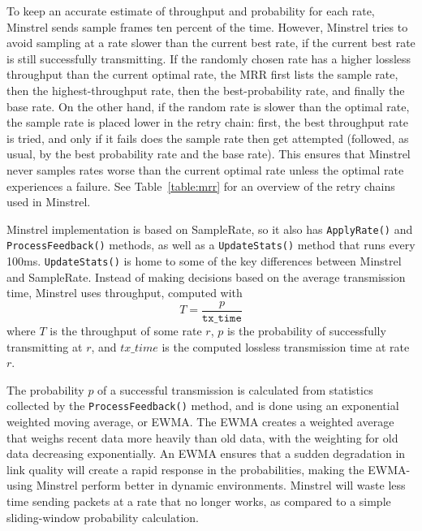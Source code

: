 \documentclass[twocolumn,10pt]{article}
\begin{document}
To keep an accurate estimate of throughput and probability for each
rate, Minstrel sends sample frames ten percent of the time.  However,
Minstrel tries to avoid sampling at a rate slower than the current
best rate, if the current best rate is still successfully
transmitting.  If the randomly chosen rate has a higher lossless
throughput than the current optimal rate, the MRR first lists the
sample rate, then the highest-throughput rate, then the
best-probability rate, and finally the base rate.  On the other hand,
if the random rate is slower than the optimal rate, the sample rate is
placed lower in the retry chain: first, the best throughput rate is
tried, and only if it fails does the sample rate then get attempted
(followed, as usual, by the best probability rate and the base rate).
This ensures that Minstrel never samples rates worse than the current
optimal rate unless the optimal rate experiences a failure.  See
Table~\ref{table:mrr} for an overview of the retry chains used in
Minstrel.

Minstrel implementation is based on SampleRate, so it also has
\texttt{ApplyRate()} and \texttt{ProcessFeedback()} methods, as well
as a \texttt{UpdateStats()} method that runs every 100ms.
\texttt{UpdateStats()} is home to some of the key differences between
Minstrel and SampleRate.  Instead of making decisions based on the
average transmission time, Minstrel uses throughput, computed with $$T
= \frac{p}{\mathtt{tx\_time}}$$ where $T$ is the throughput of some
rate $r$, $p$ is the probability of successfully transmitting at $r$,
and $tx\_time$ is the computed lossless transmission time at rate $r$.

The probability $p$ of a successful transmission is calculated from
statistics collected by the \texttt{ProcessFeedback()} method, and is
done using an exponential weighted moving average, or EWMA.  The EWMA
creates a weighted average that weighs recent data more heavily than
old data, with the weighting for old data decreasing exponentially.
An EWMA ensures that a sudden degradation in link quality will create
a rapid response in the probabilities, making the EWMA-using Minstrel
perform better in dynamic environments.  Minstrel will waste less time
sending packets at a rate that no longer works, as compared to a
simple sliding-window probability calculation.
\end{document}
